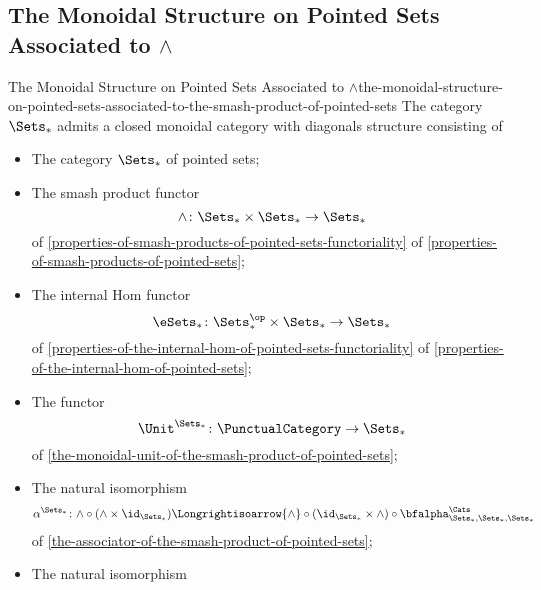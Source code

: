 \subsection{The Monoidal Structure on Pointed Sets Associated to $\wedge$}\label{subsection-the-monoidal-structure-on-pointed-sets-associated-to-the-smash-product-of-pointed-sets}
\begin{proposition}{The Monoidal Structure on Pointed Sets Associated to $\wedge$}{the-monoidal-structure-on-pointed-sets-associated-to-the-smash-product-of-pointed-sets}%
    The category $\Sets_{*}$ admits a closed monoidal category with diagonals structure consisting of%
    \begin{itemize}
        \item{}The category $\Sets_{*}$ of pointed sets;
        \item{}The smash product functor
            \[
                \wedge%
                \colon%
                \Sets_{*}\times\Sets_{*}%
                \to%
                \Sets_{*}
            \]%
            of \cref{properties-of-smash-products-of-pointed-sets-functoriality} of \cref{properties-of-smash-products-of-pointed-sets};
        \item{}The internal Hom functor
            \[
                \eSets_{*}%
                \colon%
                \Sets^{\op}_{*}\times\Sets_{*}%
                \to%
                \Sets_{*}%
            \]%
            of \cref{properties-of-the-internal-hom-of-pointed-sets-functoriality} of \cref{properties-of-the-internal-hom-of-pointed-sets};
        \item{}The functor
            \[
                \Unit^{\Sets_{*}}
                \colon
                \PunctualCategory
                \to
                \Sets_{*}
            \]
            of \cref{the-monoidal-unit-of-the-smash-product-of-pointed-sets};
        \item{}The natural isomorphism
            \[
                \alpha^{\Sets_{*}}
                \colon
                {\wedge}\circ{({\wedge}\times\id_{\Sets_{*}})}
                \Longrightisoarrow
                {\wedge}\circ{(\id_{\Sets_{*}}\times{\wedge})}\circ{\bfalpha^{\Cats}_{\Sets_{*},\Sets_{*},\Sets_{*}}}
            \]
            of \cref{the-associator-of-the-smash-product-of-pointed-sets};
        \item{}The natural isomorphism

\end{itemize}
\end{proposition}
